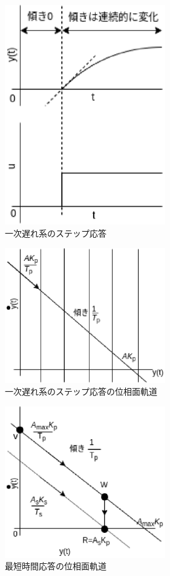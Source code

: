\documentclass[12pt]{jsarticle}
\begin{document}
\begin{figure}[H]
  \begin{center}
    \includegraphics[clip,width=7.0cm]{../Img/FigC6.eps}
    \caption{一次遅れ系のステップ応答}
    \label{FigC6}
  \end{center}
\end{figure}
\begin{figure}[H]
  \begin{center}
    \includegraphics[clip,width=7.0cm]{../Img/FigC7.eps}
    \caption{一次遅れ系のステップ応答の位相面軌道}
    \label{FigC7}
  \end{center}
\end{figure}
\begin{figure}[H]
  \begin{center}
    \includegraphics[clip,width=7.0cm]{../Img/FigC8.eps}
    \caption{最短時間応答の位相面軌道}
    \label{FigC8}
  \end{center}
\end{figure}
\end{document}
